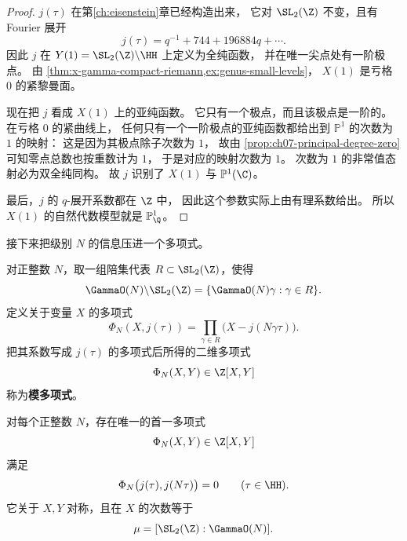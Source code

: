 \begin{proof}
$j(\tau)$ 在第\ref{ch:eisenstein}章已经构造出来，
它对 $\SL_2(\Z)$ 不变，且有 Fourier 展开
\[
  j(\tau)=q^{-1}+744+196884q+\cdots.
\]
因此 $j$ 在 $Y(1)=\SL_2(\Z)\backslash\HH$ 上定义为全纯函数，
并在唯一尖点处有一阶极点。
由 \cref{thm:x-gamma-compact-riemann,ex:genus-small-levels}，
$X(1)$ 是亏格 $0$ 的紧黎曼面。

现在把 $j$ 看成 $X(1)$ 上的亚纯函数。
它只有一个极点，而且该极点是一阶的。
在亏格 $0$ 的紧曲线上，
任何只有一个一阶极点的亚纯函数都给出到 $\mathbb P^1$ 的次数为 $1$ 的映射：
这是因为其极点除子次数为 $1$，
故由 \cref{prop:ch07-principal-degree-zero} 可知零点总数也按重数计为 $1$，
于是对应的映射次数为 $1$。
次数为 $1$ 的非常值态射必为双全纯同构。
故 $j$ 识别了 $X(1)$ 与 $\mathbb P^1(\C)$。

最后，$j$ 的 $q$-展开系数都在 $\Z$ 中，
因此这个参数实际上由有理系数给出。
所以 $X(1)$ 的自然代数模型就是 $\mathbb P^1_{\Q}$。
\end{proof}

接下来把级别 $N$ 的信息压进一个多项式。

\begin{definition}[模多项式]
\label{def:ch07-modular-polynomial}
对正整数 $N$，取一组陪集代表 $R\subset \SL_2(\Z)$，使得
\[
  \GammaO(N)\backslash \SL_2(\Z)=\{\GammaO(N)\gamma:\gamma\in R\}.
\]
定义关于变量 $X$ 的多项式
\[
  \Phi_N(X,j(\tau))=\prod_{\gamma\in R}\bigl(X-j(N\gamma\tau)\bigr).
\]
把其系数写成 $j(\tau)$ 的多项式后所得的二维多项式
\[
  \Phi_N(X,Y)\in \Z[X,Y]
\]
称为\textbf{模多项式}。
\end{definition}

\begin{theorem}[模多项式的存在与整系数性]
\label{thm:ch07-modular-polynomial}
对每个正整数 $N$，存在唯一的首一多项式
\[
  \Phi_N(X,Y)\in \Z[X,Y]
\]
满足
\[
  \Phi_N\bigl(j(\tau),j(N\tau)\bigr)=0
  \qquad (\tau\in\HH).
\]
它关于 $X,Y$ 对称，且在 $X$ 的次数等于
\[
  \mu=[\SL_2(\Z):\GammaO(N)].
\]
\end{theorem}

